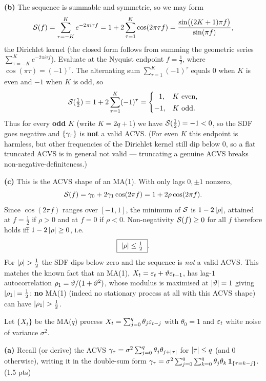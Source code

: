 \documentclass[11pt]{article}
\begin{document}
\textbf{(b)} The sequence is summable and symmetric, so we may form
\[
\mathcal{S}(f)=\sum_{\tau=-K}^{K}e^{-2\pi i\tau f}
=1+2\sum_{\tau=1}^{K}\cos(2\pi\tau f)
=\frac{\sin\bigl((2K+1)\pi f\bigr)}{\sin(\pi f)},
\]
the Dirichlet kernel (the closed form follows from summing the geometric series $\sum_{\tau=-K}^{K}e^{-2\pi i\tau f}$). Evaluate at the Nyquist endpoint $f=\tfrac12$, where $\cos(\pi\tau)=(-1)^\tau$. The alternating sum $\sum_{\tau=1}^{K}(-1)^\tau$ equals $0$ when $K$ is even and $-1$ when $K$ is odd, so
\[
\mathcal{S}(\tfrac12)=1+2\sum_{\tau=1}^{K}(-1)^\tau=
\begin{cases}
\ \ 1, & K\ \text{even},\\[2pt]
-1, & K\ \text{odd}.
\end{cases}
\]
Thus for every \textbf{odd} $K$ (write $K=2q+1$) we have $\mathcal{S}(\tfrac12)=-1<0$, so the SDF goes negative and $\{\gamma_\tau\}$ is \textbf{not} a valid ACVS. (For even $K$ this endpoint is harmless, but other frequencies of the Dirichlet kernel still dip below $0$, so a flat truncated ACVS is in general not valid --- truncating a genuine ACVS breaks non-negative-definiteness.)

\textbf{(c)} This is the ACVS shape of an MA(1). With only lags $0,\pm1$ nonzero,
\[
\mathcal{S}(f)=\gamma_0+2\gamma_1\cos(2\pi f)=1+2\rho\cos(2\pi f).
\]
Since $\cos(2\pi f)$ ranges over $[-1,1]$, the minimum of $\mathcal{S}$ is $1-2\left\lvert \rho \right\rvert$, attained at $f=\tfrac12$ if $\rho>0$ and at $f=0$ if $\rho<0$. Non-negativity $\mathcal{S}(f)\ge0$ for all $f$ therefore holds iff $1-2\left\lvert \rho \right\rvert\ge0$, i.e.
\[
\boxed{\ \abs\rho\le\tfrac12\ }.
\]
For $\left\lvert \rho \right\rvert>\tfrac12$ the SDF dips below zero and the sequence is \emph{not} a valid ACVS. This matches the known fact that an MA(1), $X_t=\varepsilon_t+\vartheta\varepsilon_{t-1}$, has lag-$1$ autocorrelation $\rho_1=\vartheta/(1+\vartheta^2)$, whose modulus is maximised at $\left\lvert \vartheta \right\rvert=1$ giving $\left\lvert \rho_1 \right\rvert=\tfrac12$: \textbf{no} MA(1) (indeed no stationary process at all with this ACVS shape) can have $\left\lvert \rho_1 \right\rvert>\tfrac12$.

\statementstart
Let $\{X_t\}$ be the MA($q$) process $X_t=\sum_{j=0}^{q}\theta_j\varepsilon_{t-j}$ with $\theta_0=1$ and $\varepsilon_t$ white noise of variance $\sigma^2$.

\textbf{(a)} Recall (or derive) the ACVS $\gamma_\tau=\sigma^2\sum_{j=0}^{q}\theta_j\theta_{j+\left\lvert \tau \right\rvert}$ for $\left\lvert \tau \right\rvert\le q$ (and $0$ otherwise), writing it in the double-sum form $\gamma_\tau=\sigma^2\sum_{j=0}^{q}\sum_{k=0}^{q}\theta_j\theta_k\,\mathbf{1}_{\{\tau=k-j\}}$. \hfill(1.5 pts)
\end{document}
